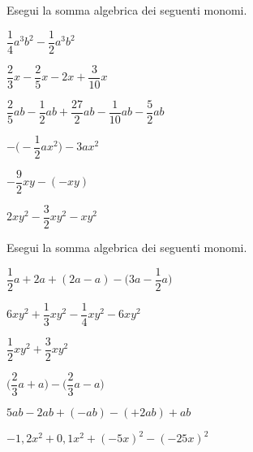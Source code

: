 \begin{esercizio}
 \label{ese:9.29}
Esegui la somma algebrica dei seguenti monomi.
\begin{multicols}{2}
\begin{enumeratea}
\spazielenx
 \item $\dfrac{1}{4}a^{3}b^{2}-\dfrac{1}{2}a^{3}b^{2}$
 \item $\dfrac{2}{3}x-\dfrac{2}{5}x-2x+\dfrac{3}{10}x$
 \item 
$\dfrac{2}{5}ab-\dfrac{1}{2}ab+\dfrac{27}{2}ab-\dfrac{1}{10}ab-\dfrac{5}{2}ab$
 \item $-\bigg(-{\dfrac{1}{2}}ax^{2}\bigg)-3ax^{2}$
 \item $-{\dfrac{9}{2}}xy-(-xy)$
 \item $2xy^{2}-\dfrac{3}{2}xy^{2}-xy^{2}$
\end{enumeratea}
\end{multicols}
\end{esercizio}

\begin{esercizio}
 \label{ese:9.30}
Esegui la somma algebrica dei seguenti monomi.
\begin{multicols}{2}
\begin{enumeratea}
\spazielenx
 \item $\dfrac{1}{2}a+2a+(2a-a)-\bigg(3a-\dfrac{1}{2}a\bigg)$
 \item $6xy^{2}+\dfrac{1}{3}xy^{2}-\dfrac{1}{4}xy^{2}-6xy^{2}$
 \item $\dfrac{1}{2}xy^{2}+\dfrac{3}{2}xy^{2}$
 \item $\bigg(\dfrac{2}{3}a+a\bigg)-\bigg(\dfrac{2}{3}a-a\bigg)$
 \item $5ab-2ab+(-ab)-(+2ab)+ab$
 \item $-1,2x^{2}+0,1x^{2}+(-5x)^{2}-(-25x)^{2}$
\end{enumeratea}
\end{multicols}

\end{esercizio}



